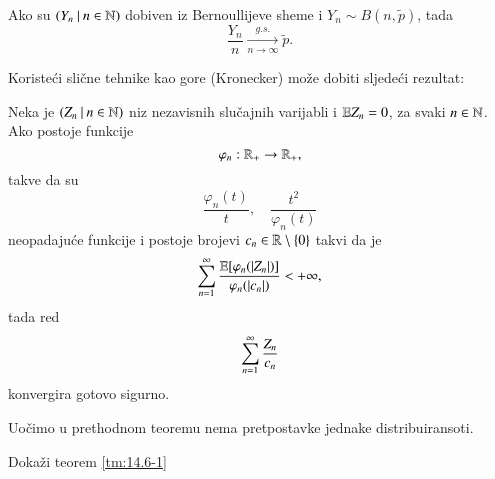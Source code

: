 \begin{kor} \label{kor:14.6}
    Ako su $({Y_n} \: | \: {n \in \mathbb{N}})$ dobiven iz Bernoullijeve sheme i $Y_n \sim B(n, \tilde{p})$, tada
    \begin{equation*}
        \frac{Y_n}{n} \xrightarrow[n \to \infty]{g.s.} \tilde{p}.
    \end{equation*}
\end{kor}

Koriste\' ci sli\v cne tehnike kao gore (Kronecker) mo\v ze dobiti sljede\' ci rezultat:

\begin{tm}  \label{tm:14.6-1}
    Neka je $({Z_n} \: | \: {n \in \mathbb{N}})$ niz nezavisnih slu\v cajnih varijabli i $\mathbb{E} Z_n = 0$, za svaki $n \in \mathbb{N}$.
    Ako postoje funkcije
    \begin{equation*}
        \varphi_n : \mathbb{R}_+ \to \mathbb{R}_+,
    \end{equation*}
    takve da su
    \begin{equation*}
        \frac{\varphi_n (t)}{t}, \quad \frac{t^2}{\varphi_n (t)}
    \end{equation*}
    neopadaju\' ce funkcije i postoje brojevi $c_n \in \mathbb{R} \setminus \{0\}$ takvi da je
    \begin{equation*}
        \sum\limits_{n = 1}^{\infty} \frac{\mathbb{E} [ \varphi_n (|Z_n|) ]}{\varphi_n (|c_n|)} < +\infty,
    \end{equation*}
    tada red
    \begin{equation*}
        \sum\limits_{n = 1}^{\infty} \frac{Z_n}{c_n}
    \end{equation*}
    konvergira gotovo sigurno.
\end{tm}

Uo\v cimo u prethodnom teoremu nema pretpostavke jednake distribuiransoti.

\begin{zad} \label{zad:14.7}
    Doka\v zi teorem \ref{tm:14.6-1}
\end{zad}

